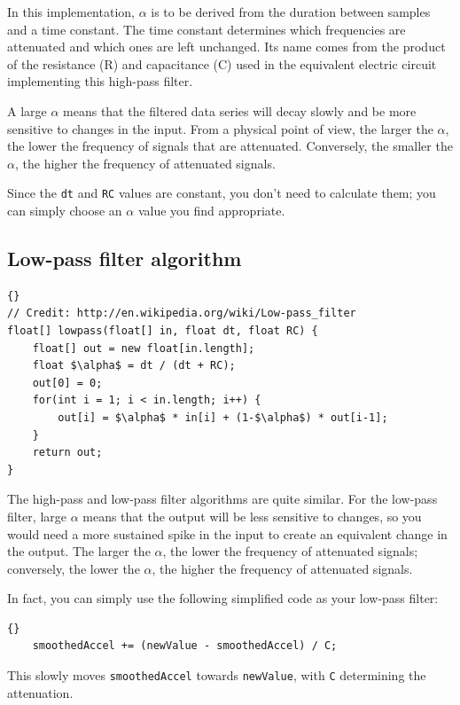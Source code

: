 \documentclass[10pt]{article}
\begin{document}
In this implementation, $\alpha$ is to be derived from the duration between samples and a time constant. The time constant determines which frequencies are attenuated and which ones are left unchanged. Its name comes from the product of the resistance (R) and capacitance (C) used in the equivalent electric circuit implementing this high-pass filter.

A large $\alpha$ means that the filtered data series will decay slowly and be more sensitive to changes in the input. From a physical point of view, the larger the $\alpha$, the lower the frequency of signals that are attenuated. Conversely, the smaller the $\alpha$, the higher the frequency of attenuated signals. 

Since the {\tt dt} and {\tt RC} values are constant, you don't need to calculate them; you can simply choose an $\alpha$ value you find appropriate. 

\subsection{Low-pass filter algorithm}
\begin{lstlisting}[frame=trbl]{}
// Credit: http://en.wikipedia.org/wiki/Low-pass_filter
float[] lowpass(float[] in, float dt, float RC) {
	float[] out = new float[in.length];
	float $\alpha$ = dt / (dt + RC);
	out[0] = 0;
	for(int i = 1; i < in.length; i++) {
		out[i] = $\alpha$ * in[i] + (1-$\alpha$) * out[i-1];
	}
	return out;
}
\end{lstlisting}

The high-pass and low-pass filter algorithms are quite similar. For the low-pass filter, large $\alpha$ means that the output will be less sensitive to changes, so you would need a more sustained spike in the input to create an equivalent change in the output. The larger the $\alpha$, the lower the frequency of attenuated signals; conversely, the lower the $\alpha$, the higher the frequency of attenuated signals.

In fact, you can simply use the following simplified code as your low-pass filter:
\begin{lstlisting}[frame=trbl]{}
    smoothedAccel += (newValue - smoothedAccel) / C;
\end{lstlisting}
This slowly moves {\tt smoothedAccel} towards {\tt newValue}, 
with {\tt C} determining the attenuation.
\end{document}
